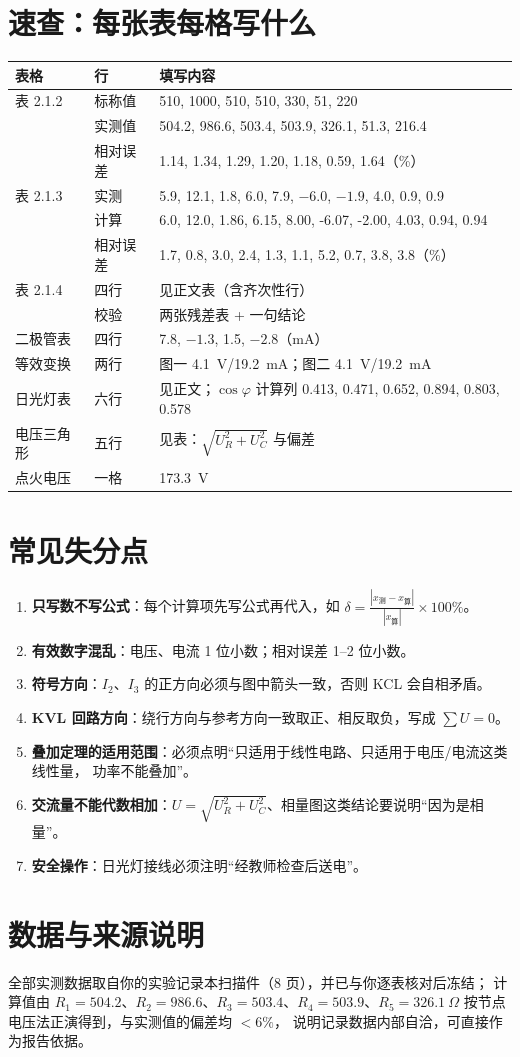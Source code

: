 \documentclass[UTF8,a4paper,10.5pt]{ctexart}
\newcommand{\key}[1]{\textbf{\color{acc}#1}}
\begin{document}
\newpage
\appendix
\section{速查：每张表每格写什么}
\begin{center}
\footnotesize\setlength{\tabcolsep}{3pt}
\begin{tabularx}{\linewidth}{@{}p{2.4cm}p{2.6cm}X@{}}
\toprule
表格 & 行 & 填写内容\\
\midrule
表 2.1.2 & 标称值 & 510, 1000, 510, 510, 330, 51, 220\\
 & 实测值 & 504.2, 986.6, 503.4, 503.9, 326.1, 51.3, 216.4\\
 & 相对误差 & 1.14, 1.34, 1.29, 1.20, 1.18, 0.59, 1.64（\%）\\
\midrule
表 2.1.3 & 实测 & 5.9, 12.1, 1.8, 6.0, 7.9, $-6.0$, $-1.9$, 4.0, 0.9, 0.9\\
 & 计算 & 6.0, 12.0, 1.86, 6.15, 8.00, -6.07, -2.00, 4.03, 0.94, 0.94\\
 & 相对误差 & 1.7, 0.8, 3.0, 2.4, 1.3, 1.1, 5.2, 0.7, 3.8, 3.8（\%）\\
\midrule
表 2.1.4 & 四行 & 见正文表（含齐次性行）\\
 & 校验 & 两张残差表 + 一句结论\\
\midrule
二极管表 & 四行 & 7.8, $-1.3$, 1.5, $-2.8$（mA）\\
\midrule
等效变换 & 两行 & 图一 4.1~V/19.2~mA；图二 4.1~V/19.2~mA\\
\midrule
日光灯表 & 六行 & 见正文；$\cos\varphi$ 计算列 0.413, 0.471, 0.652, 0.894, 0.803, 0.578\\
\midrule
电压三角形 & 五行 & 见表：$\sqrt{U_R^2+U_C^2}$ 与偏差\\
\midrule
点火电压 & 一格 & 173.3~V\\
\bottomrule
\end{tabularx}
\end{center}

\section{常见失分点}
\begin{enumerate}
  \item \key{只写数不写公式}：每个计算项先写公式再代入，如
        $\delta=\frac{|x_{\text{测}}-x_{\text{算}}|}{|x_{\text{算}}|}\times100\%$。
  \item \key{有效数字混乱}：电压、电流 1 位小数；相对误差 1--2 位小数。
  \item \key{符号方向}：$I_2$、$I_3$ 的正方向必须与图中箭头一致，否则 KCL 会自相矛盾。
  \item \key{KVL 回路方向}：绕行方向与参考方向一致取正、相反取负，写成 $\sum U=0$。
  \item \key{叠加定理的适用范围}：必须点明“只适用于线性电路、只适用于电压/电流这类线性量，
        功率不能叠加”。
  \item \key{交流量不能代数相加}：$U=\sqrt{U_R^2+U_C^2}$、相量图这类结论要说明“因为是相量”。
  \item \key{安全操作}：日光灯接线必须注明“经教师检查后送电”。
\end{enumerate}

\section{数据与来源说明}
全部实测数据取自你的实验记录本扫描件（8 页），并已与你逐表核对后冻结；
计算值由 $R_1=504.2$、$R_2=986.6$、$R_3=503.4$、$R_4=503.9$、$R_5=326.1\ \Omega$
按节点电压法正演得到，与实测值的偏差均 $<6\%$，
说明记录数据内部自洽，可直接作为报告依据。
\end{document}
